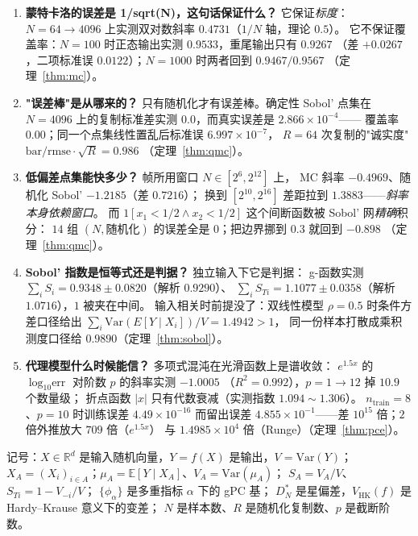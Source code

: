 \begin{enumerate}
  \item \textbf{蒙特卡洛的误差是 1/sqrt(N)，这句话保证什么？} 它保证\emph{标度}：
        $N=64\to4096$ 上实测双对数斜率 $0.4731$（$1/N$ 轴，理论 $0.5$）。
        它不保证覆盖率：$N=100$ 时正态输出实测 $0.9533$，重尾输出只有 $0.9267$
        （差 $+0.0267$，二项标准误 $0.0122$）；$N=1000$ 时两者回到 $0.9467/0.9567$
        （定理~\ref{thm:mc}）。
  \item \textbf{"误差棒"是从哪来的？} 只有随机化才有误差棒。确定性 Sobol' 点集在
        $N=4096$ 上的复制标准差实测 $0.0$，而真实误差是 $2.866\times10^{-4}$——
        覆盖率 $0.00$；同一个点集线性置乱后标准误 $6.997\times10^{-7}$，
        $R=64$ 次复制的"诚实度" $\text{bar}/\text{rmse}\cdot\sqrt R=0.986$
        （定理~\ref{thm:qmc}）。
  \item \textbf{低偏差点集能快多少？} 帧所用窗口 $N\in[2^6,2^{12}]$ 上，
        MC 斜率 $-0.4969$、随机化 Sobol' $-1.2185$（差 $0.7216$）；
        换到 $[2^{10},2^{16}]$ 差距拉到 $1.3883$——\emph{斜率本身依赖窗口}。
        而 $1[x_1<1/2\wedge x_2<1/2]$ 这个间断函数被 Sobol' 网\emph{精确}积分：
        $14$ 组 $(N,\text{随机化})$ 的误差全是 $0$；把边界挪到 $0.3$ 就回到 $-0.898$
        （定理~\ref{thm:qmc}）。
  \item \textbf{Sobol' 指数是恒等式还是判据？} 独立输入下它是判据：
        g-函数实测 $\sum_iS_i=0.9348\pm0.0820$（解析 $0.9290$）、
        $\sum_iS_{Ti}=1.1077\pm0.0358$（解析 $1.0716$），$1$ 被夹在中间。
        输入相关时前提没了：双线性模型 $\rho=0.5$ 时条件方差口径给出
        $\sum_i\mathrm{Var}(E[Y\mid X_i])/V=1.4942>1$，
        同一份样本打散成乘积测度口径给 $0.9890$（定理~\ref{thm:sobol}）。
  \item \textbf{代理模型什么时候能信？} 多项式混沌在光滑函数上是谱收敛：
        $e^{1.5x}$ 的 $\log_{10}\text{err}$ 对阶数 $p$ 的斜率实测 $-1.0005$
        （$R^2=0.992$），$p=1\to12$ 掉 $10.9$ 个数量级；
        折点函数 $\lvert x\rvert$ 只有代数衰减（实测指数 $1.094\sim1.306$）。
        $n_{\text{train}}=8$、$p=10$ 时训练误差 $4.49\times10^{-16}$ 而留出误差
        $4.855\times10^{-1}$——差 $10^{15}$ 倍；$2$ 倍外推放大 $709$ 倍（$e^{1.5x}$）
        与 $1.4985\times10^4$ 倍（Runge）（定理~\ref{thm:pce}）。
\end{enumerate}

记号：$X\in\mathbb{R}^d$ 是输入随机向量，$Y=f(X)$ 是输出，$V=\mathrm{Var}(Y)$；
$X_A=(X_i)_{i\in A}$；$\mu_A=\mathbb{E}[Y\mid X_A]$、$V_A=\mathrm{Var}(\mu_A)$；
$S_A=V_A/V$、$S_{Ti}=1-V_{-i}/V$；
$\{\phi_\alpha\}$ 是多重指标 $\alpha$ 下的 gPC 基；
$D_N^\ast$ 是星偏差，$V_{\mathrm{HK}}(f)$ 是 Hardy--Krause 意义下的变差；
$N$ 是样本数、$R$ 是随机化复制数、$p$ 是截断阶数。

